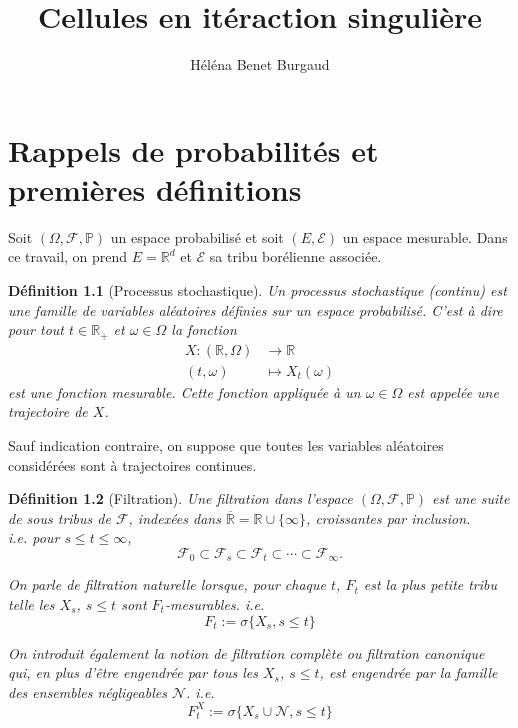 \documentclass[openany]{book}
\title{Cellules en itéraction singulière}
\author{Héléna Benet Burgaud}
\newcommand{\F}{\mathscr{F}}
\newcommand{\N}{\mathscr{N}}
\newcommand{\carE}{\mathscr{E}}
\renewcommand{\P}{\mathds{P}}
\newcommand{\R}{\mathbb{R}}
\theoremstyle{thmfont}
\theoremstyle{deffont}
\newtheorem{definition}[definition]{Définition}
\theoremstyle{thmfont}
\theoremstyle{deffont}
\begin{document}

\maketitle
\tableofcontents
\clearpage
{} %
\setcounter{page}{1}
\let\cleardoublepage\relax
\chapter{Rappels de probabilités et premières définitions}

Soit $(\Omega, \F, \P )$ un espace probabilisé et soit $(E, \carE)$ un espace mesurable. Dans ce travail, on prend $E = \R^d$ et $\carE$ sa tribu borélienne associée.

\begin{definition}[Processus stochastique] Un \textit{processus stochastique (continu)} est une famille de variables aléatoires définies sur un espace probabilisé. C'est à dire pour tout $t \in \R_+$ et $\omega \in \Omega$ la fonction 
 \begin{align*}
   X : (\R, \Omega) &\rightarrow \R \\
   (t, \omega) &\mapsto X_t(\omega)
 \end{align*} 
est une fonction mesurable. Cette fonction appliquée à un $\omega \in \Omega$ est appelée une \textit{trajectoire} de $X$.
\end{definition}

 Sauf indication contraire, on suppose que toutes les variables aléatoires considérées sont à trajectoires continues. 

\begin{definition}[Filtration] Une \textit{filtration} dans l'espace $(\Omega, \F, \P )$ est une suite de sous tribus de $\F$, indexées dans $\overline{\R} = \R \cup \{\infty\}$, croissantes par inclusion.\\
i.e. pour $s \leq t \leq \infty$,
$$\F_0 \subset \F_s \subset \F_t\subset \cdots \subset \F_\infty .$$

On parle de \textit{filtration naturelle} lorsque, pour chaque $t$, $F_t$ est la plus petite tribu telle les $X_s$, $s\leq t$ sont $F_t$-mesurables. i.e.
$$F_t := \sigma\{X_s, s\leq t\}$$

On introduit également la notion de \textit{filtration complète} ou
\textit{filtration canonique} qui, en plus d'être engendrée par tous les $X_s$, $s \leq t$, est engendrée par la famille des ensembles négligeables $\N$. i.e.
$$F^X_t := \sigma\{X_s\cup \N, s\leq t\}$$

\label{def:filtration}
\end{definition}
\end{document}
